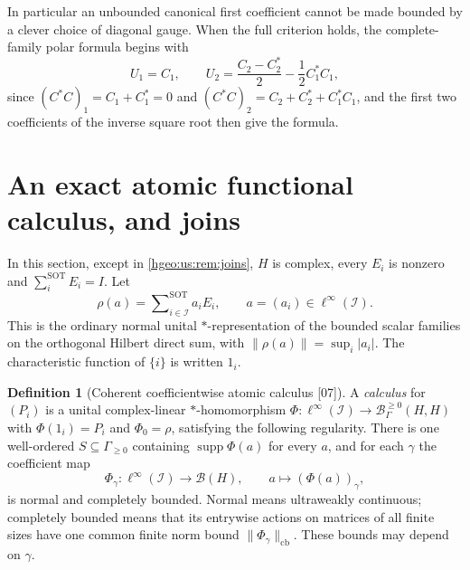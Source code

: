 \documentclass[11pt,letterpaper]{article}
\numberwithin{equation}{section}
\theoremstyle{definition}
\newtheorem{definition}[definition]{Definition}
\theoremstyle{remark}
\newcommand{\supp}{\operatorname{supp}}
\newcommand{\norm}[1]{\lVert #1\rVert}
\newcommand{\abs}[1]{\lvert #1\rvert}
\newcommand{\src}[1]{\textup{\textsf{\small[#1]}}}
\newcommand{\sSOT}{\mathop{\sum}\nolimits^{\mathrm{SOT}}}
\newcommand{\Bnn}{\mathscr B^{\ge0}_\Gamma(H,H)}
\newcommand{\cb}{\mathrm{cb}}
\begin{document}
In particular an unbounded canonical first coefficient cannot be made bounded
by a clever choice of diagonal gauge. When the full criterion holds, the
complete-family polar formula begins with
\[
 U_1=C_1,\qquad U_2=\frac{C_2-C_2^*}{2}-\frac12C_1^*C_1 ,
\]
since $(C^*C)_1=C_1+C_1^*=0$ and $(C^*C)_2=C_2+C_2^*+C_1^*C_1$, and the first
two coefficients of the inverse square root then give the formula.

\section{An exact atomic functional calculus, and joins}
\label{hgeo:us:sec:calculus}

In this section, except in \cref{hgeo:us:rem:joins}, $H$ is complex, every
$E_i$ is nonzero and $\sSOT_iE_i=I$. Let
\begin{equation}\label{hgeo:us:eq:rho}
 \rho(a)=\sSOT_{i\in\mathcal I}a_iE_i,\qquad a=(a_i)\in\ell^\infty(\mathcal I).
\end{equation}
This is the ordinary normal unital $*$-representation of the bounded scalar
families on the orthogonal Hilbert direct sum, with
$\norm{\rho(a)}=\sup_i\abs{a_i}$. The characteristic function of
$\{i\}$ is written $1_i$.

\begin{definition}[Coherent coefficientwise atomic calculus \src{07}]
\label{hgeo:us:def:calculus}
A \emph{calculus} for $(P_i)$ is a unital complex-linear $*$-homomorphism
$\Phi:\ell^\infty(\mathcal I)\to\Bnn$ with $\Phi(1_i)=P_i$ and $\Phi_0=\rho$,
satisfying the following regularity. There is one well-ordered
$S\subseteq\Gamma_{\ge0}$ containing $\supp\Phi(a)$ for every $a$, and for
each $\gamma$ the coefficient map
\[
 \Phi_\gamma:\ell^\infty(\mathcal I)\to\mathcal B(H),\qquad
 a\mapsto(\Phi(a))_\gamma ,
\]
is normal and completely bounded. Normal means ultraweakly continuous;
completely bounded means that its entrywise actions on matrices of all
finite sizes have one common finite norm bound $\norm{\Phi_\gamma}_{\cb}$.
These bounds may depend on $\gamma$.
\end{definition}
\end{document}
